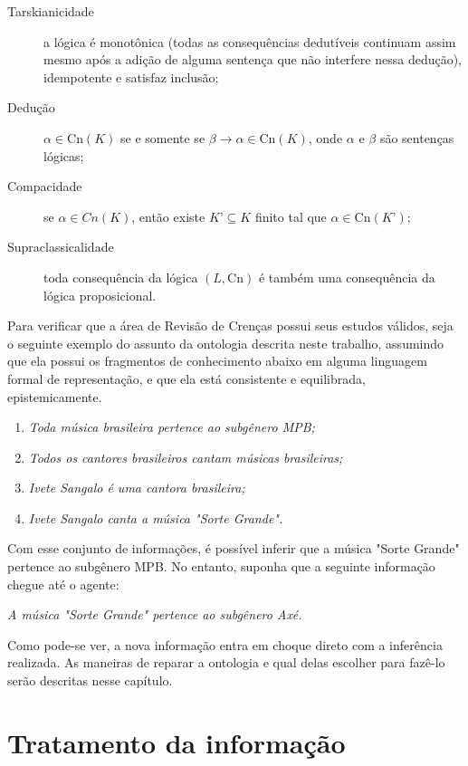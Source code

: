 \begin{description}
	\item[Tarskianicidade] a lógica é monotônica (todas as consequências dedutíveis continuam assim mesmo após a adição de alguma sentença que não interfere nessa dedução), idempotente e satisfaz inclusão;
	\item[Dedução] $ \alpha \in \text{Cn}(K) $ se e somente se $ \beta \to \alpha \in \text{Cn}(K) $, onde $ \alpha $ e $ \beta $ são sentenças lógicas;
	\item[Compacidade] se $ \alpha \in Cn(K) $, então existe $ K’ \subseteq K $ finito tal que $ \alpha \in \text{Cn}(K’) $;
	\item[Supraclassicalidade] toda consequência da lógica $ (L, \text{Cn}) $ é também uma consequência da lógica proposicional.
\end{description} 

Para verificar que a área de Revisão de Crenças possui seus estudos válidos, seja o seguinte exemplo do assunto da ontologia descrita neste trabalho, assumindo que ela possui os fragmentos de conhecimento abaixo em alguma linguagem formal de representação, e que ela está consistente e equilibrada, epistemicamente.

\begin{enumerate}
	\item \textit{Toda música brasileira pertence ao subgênero MPB;}
	\item \textit{Todos os cantores brasileiros cantam músicas brasileiras;}
	\item \textit{Ivete Sangalo é uma cantora brasileira;}
	\item \textit{Ivete Sangalo canta a música "Sorte Grande".}
\end{enumerate}

Com esse conjunto de informações, é possível inferir que a música "Sorte Grande" pertence ao subgênero MPB. No entanto, suponha que a seguinte informação chegue até o agente:

\begin{center}
	\textit{A música "Sorte Grande" pertence ao subgênero Axé.}
\end{center}

Como pode-se ver, a nova informação entra em choque direto com a inferência realizada. As maneiras de reparar a ontologia e qual delas escolher para fazê-lo serão descritas nesse capítulo.

\section{Tratamento da informação}

